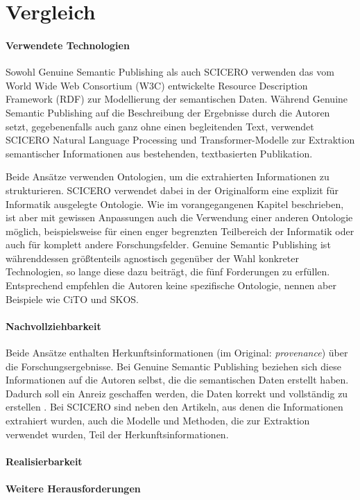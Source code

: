 \section{Vergleich}
\label{sec:vergleich}


\paragraph{Verwendete Technologien}

Sowohl Genuine Semantic Publishing als auch SCICERO verwenden das vom World Wide Web Consortium (W3C) entwickelte Resource Description Framework (RDF) zur Modellierung der semantischen Daten.
Während Genuine Semantic Publishing auf die Beschreibung der Ergebnisse durch die Autoren setzt, gegebenenfalls auch ganz ohne einen begleitenden Text, verwendet SCICERO Natural Language Processing und Transformer-Modelle zur Extraktion semantischer Informationen aus bestehenden, textbasierten Publikation.

Beide Ansätze verwenden Ontologien, um die extrahierten Informationen zu strukturieren.
SCICERO verwendet dabei in der Originalform eine explizit für Informatik ausgelegte Ontologie.
Wie im vorangegangenen Kapitel beschrieben, ist aber mit gewissen Anpassungen auch die Verwendung einer anderen Ontologie möglich, beispielsweise für einen enger begrenzten Teilbereich der Informatik oder auch für komplett andere Forschungsfelder.
Genuine Semantic Publishing ist währenddessen größtenteils agnostisch gegenüber der Wahl konkreter Technologien, so lange diese dazu beiträgt, die fünf Forderungen zu erfüllen.
Entsprechend empfehlen die Autoren keine spezifische Ontologie, nennen aber Beispiele wie CiTO und SKOS.

\paragraph{Nachvollziehbarkeit}

Beide Ansätze enthalten Herkunftsinformationen (im Original: \textit{provenance}) über die Forschungsergebnisse.
Bei Genuine Semantic Publishing beziehen sich diese Informationen auf die Autoren selbst, die die semantischen Daten erstellt haben.
Dadurch soll ein Anreiz geschaffen werden, die Daten korrekt und vollständig zu erstellen \cite{kuhn2017genuine}.
Bei SCICERO sind neben den Artikeln, aus denen die Informationen extrahiert wurden, auch die Modelle und Methoden, die zur Extraktion verwendet wurden, Teil der Herkunftsinformationen.



\paragraph{Realisierbarkeit}

\paragraph{Weitere Herausforderungen}
